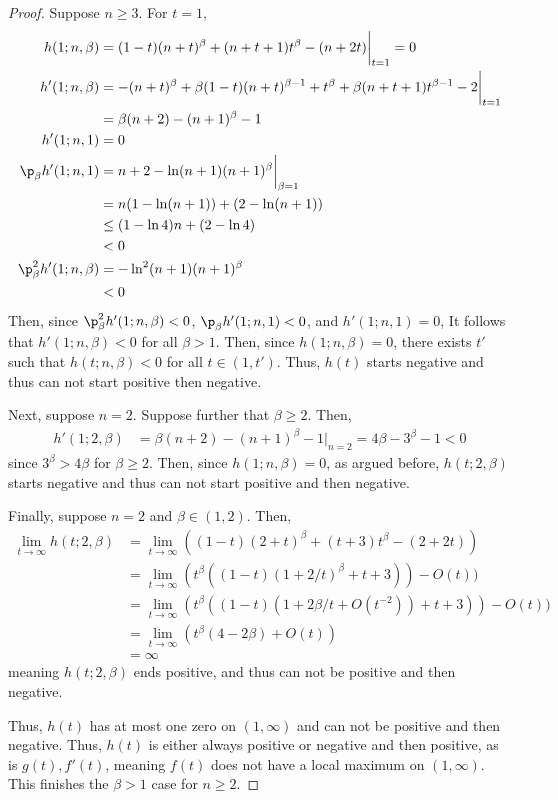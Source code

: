 \documentclass[11pt]{article}
\begin{document}
\begin{proof}
Suppose $n\geq 3$. For $t=1$,
\begin{align*}
    h(1;n,\beta)&=(1-t)(n+t)^\beta +(n+t+1)t^\beta-(n+2t)\bigg|_{t=1}=0\\
    h'(1;n,\beta)&=-(n+t)^\beta +\beta(1-t)(n+t)^{\beta-1}+t^\beta + \beta (n+t+1) t^{\beta-1}-2\bigg|_{t=1}\\
    &=\beta(n+2)-(n+1)^\beta-1\\
    h'(1;n,1)&=0\\
    \p_\beta h'(1;n,1)&=n+2-\ln(n+1)(n+1)^\beta \bigg|_{\beta=1}\\&=n(1-\ln(n+1))+(2-\ln(n+1))\\
    &\leq (1-\ln 4)n+(2-\ln 4)\\
    &<0\\
    \p_\beta^2 h'(1;n,\beta)&=-\ln^2(n+1)(n+1)^\beta \\&< 0 
\end{align*}
Then, since $\p_\beta^2 h'(1;n,\beta)<0$, $\p_\beta h'(1;n,1)<0$, and $h'(1;n,1)=0$, It follows that $h'(1;n,\beta)<0$ for all $\beta > 1$. Then, since $h(1;n,\beta)=0$, there exists $t'$ such that $h(t;n,\beta)<0$ for all $t\in (1,t')$. Thus, $h(t)$ starts negative and thus can not start positive then negative. 

Next, suppose $n=2$. Suppose further that $\beta \geq 2$. Then, 
\begin{align*}
    h'(1;2,\beta)&=\beta(n+2)-(n+1)^\beta -1 \bigg|_{n=2}=4\beta-3^\beta -1<0
\end{align*}
since $3^\beta > 4\beta $ for $\beta \geq 2$. Then, since $h(1;n,\beta)=0$, as argued before, $h(t;2,\beta)$ starts negative and thus can not start positive and then negative. 

Finally, suppose $n=2$ and $\beta \in (1,2)$. Then, 
\begin{align*}
    \lim_{t\to \infty}h(t;2,\beta)&=\lim_{t\to \infty}((1-t)(2+t)^\beta +(t+3)t^\beta -(2+2t))\\
    &=\lim_{t\to \infty}(t^\beta ((1-t)(1+2/t)^\beta +t+3))-O(t))\\
    &=\lim_{t\to \infty}(t^\beta ((1-t)(1+2\beta/t+O(t^{-2})) +t+3))-O(t))\\
    &=\lim_{t\to \infty}(t^\beta (4-2\beta )+O(t))\\
    &=\infty
\end{align*}
meaning $h(t;2,\beta)$ ends positive, and thus can not be positive and then negative. 

Thus, $h(t)$ has at most one zero on $(1,\infty)$ and can not be positive and then negative. Thus, $h(t)$ is either always positive or negative and then positive, as is $g(t),f'(t)$, meaning $f(t)$ does not have a local maximum on $(1,\infty)$. This finishes the $\beta > 1$ case for $n\geq 2$. 


\end{proof}
\end{document}
